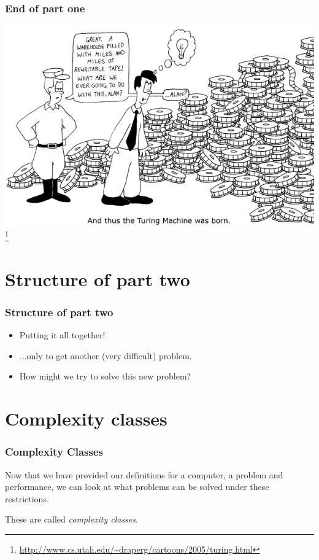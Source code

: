 \documentclass[aspectratio=169]{beamer}
\begin{document}
\begin{frame}
\frametitle{End of part one}
\begin{center}
\includegraphics{turing_comic}\footnote{\url{http://www.cs.utah.edu/~draperg/cartoons/2005/turing.html}}
\end{center}
\end{frame}

\section{Structure of part two}

\begin{frame}
\frametitle{Structure of part two}
\begin{itemize}
    \item Putting it all together!
    \item ...only to get another (very difficult) problem.
    \item How might we try to solve this new problem?
\end{itemize}
\end{frame}

\section{Complexity classes}

\begin{frame}
\frametitle{Complexity Classes}
Now that we have provided our definitions for a computer, a problem and performance, we can look at what problems can be solved under these restrictions.

These are called {\em complexity classes}.
\end{frame}
\end{document}
